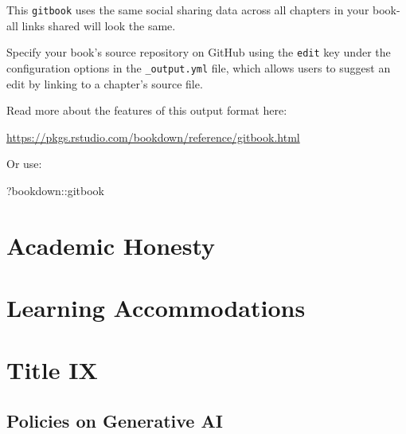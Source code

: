 \documentclass[]{tufte-handout}
\newenvironment{Shaded}{}{}
\newcommand{\NormalTok}[1]{#1}
\newcommand{\OperatorTok}[1]{\textcolor[rgb]{0.40,0.40,0.40}{#1}}
\begin{document}
This \texttt{gitbook} uses the same social sharing data across all chapters in your book- all links shared will look the same.

Specify your book's source repository on GitHub using the \texttt{edit} key under the configuration options in the \texttt{\_output.yml} file, which allows users to suggest an edit by linking to a chapter's source file.

Read more about the features of this output format here:

\url{https://pkgs.rstudio.com/bookdown/reference/gitbook.html}

Or use:

\begin{Shaded}
\begin{Highlighting}[]
\NormalTok{?bookdown}\OperatorTok{::}\NormalTok{gitbook}
\end{Highlighting}
\end{Shaded}

\hypertarget{academic-honesty}{%
\section{Academic Honesty}\label{academic-honesty}}

\hypertarget{learning-accommodations}{%
\section{Learning Accommodations}\label{learning-accommodations}}

\hypertarget{title-ix}{%
\section{Title IX}\label{title-ix}}

\hypertarget{policies-on-generative-ai}{%
\subsection{Policies on Generative AI}\label{policies-on-generative-ai}}


\end{document}
